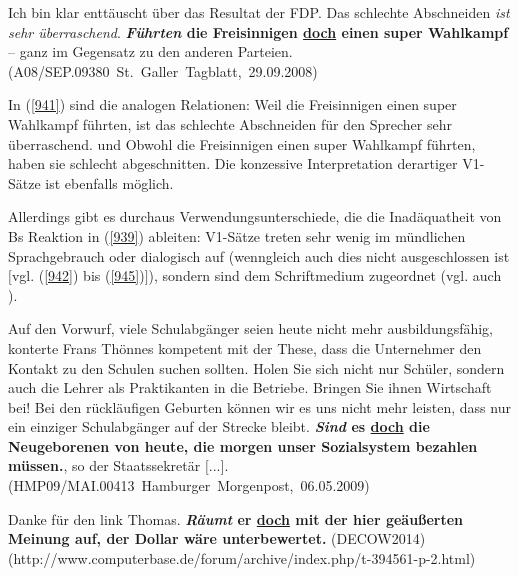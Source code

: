 {\begin{exe}
	\ex\label{941}
	\scriptsize
	Ich bin klar enttäuscht über das Resultat der FDP. Das schlechte Abschneiden \emph{ist sehr überraschend}. \textbf{\textit{Führten} die Freisinnigen 		\underline{doch} einen super Wahlkampf} – ganz im Gegensatz zu den anderen Parteien. 
	\newline  
	\hbox{}\hfill\hbox{(A08/SEP.09380 St. Galler Tagblatt, 29.09.2008)}
\end{exe}
In (\ref{941}) sind die analogen Relationen: \glq Weil die Freisinnigen einen super Wahlkampf führten, ist das schlechte Abschneiden für den Sprecher sehr überraschend.\grq {} und \glq Obwohl die Freisinnigen einen super Wahlkampf führten, haben sie schlecht abgeschnitten.\grq {} Die konzessive Interpretation derartiger V1-Sätze ist ebenfalls möglich.

Allerdings gibt es durchaus Verwendungsunterschiede, die die Inadäquatheit von Bs Reaktion in (\ref{939}) ableiten: V1-Sätze treten sehr wenig im mündlichen Sprachgebrauch oder dialogisch auf (wenngleich auch dies nicht ausgeschlossen ist $[$vgl. (\ref{942}) bis (\ref{945})$]$), sondern sind dem Schriftmedium zugeordnet (vgl. auch \citealt[157]{Oennerfors1997}).
	
\begin{exe}
	\ex\label{942}
	\scriptsize
	Auf den Vorwurf, viele Schulabgänger seien heute nicht mehr ausbildungsfähig, konterte Frans Thön\-nes kompetent mit der These, dass die Unternehmer den 		Kontakt zu den Schulen suchen sollten. \glqq Holen Sie sich nicht nur Schüler, sondern auch die Lehrer als Praktikanten in die Betriebe. Bringen Sie 		ihnen Wirtschaft bei! Bei den rückläufigen Geburten können wir es uns nicht mehr leisten, dass nur ein einziger Schulabgänger auf der Strecke bleibt. 		\textbf{\textit{Sind} es \underline{doch} die Neugeborenen von heute, die morgen unser Sozialsystem bezahlen müssen.}\grqq{}, so der Staatssekretär 		$[$...$]$.                                                                                           
	\newline  
	\hbox{}\hfill\hbox{(HMP09/MAI.00413 Hamburger Morgenpost, 06.05.2009)}
\end{exe}	
	
\begin{exe}
	\ex\label{943}
	\scriptsize
	Danke für den link Thomas. \textbf{\textit{Räumt} er \underline{doch} mit der hier geäußerten Meinung auf, der Dollar wäre unterbewertet.                                                                                           	}
	\hfill\hbox{(DECOW2014)}
	\newline  
	\hbox{}\hfill\hbox{(http://www.computerbase.de/forum/archive/index.php/t-394561-p-2.html)}
\end{exe}		
	 
}
